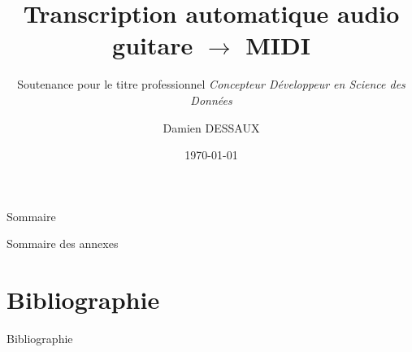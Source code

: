 \documentclass[aspectratio=169, 10pt]{beamer}
\title{Transcription automatique audio guitare $\rightarrow$ MIDI}
\subtitle{Soutenance pour le titre professionnel \textit{Concepteur Développeur en Science des Données}}
\author{Damien DESSAUX}
\institute{M2i}
\date{\today}
\begin{document}
\begin{frame}
    \titlepage
\end{frame}

\begin{frame}{Sommaire}
    \tableofcontents
\end{frame}












\appendix
\begin{frame}{Sommaire des annexes}
	\tableofcontents[sections={9-12}]
\end{frame}



\section{Bibliographie}
\begin{frame}[allowframebreaks]{Bibliographie}
	\nocite{*}
    
    
\end{frame}
\end{document}
